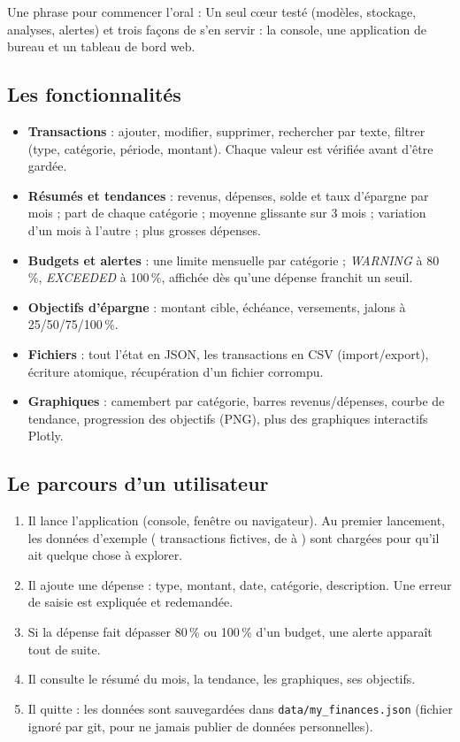 \documentclass[11pt,a4paper]{article}
\newcommand{\code}[1]{{\NoAutoSpacing\texttt{#1}}}
\begin{document}
\begin{alerte}
Une phrase pour commencer l'oral : \og Un seul cœur testé (modèles, stockage, analyses,
alertes) et trois façons de s'en servir : la console, une application de bureau et un
tableau de bord web. \fg
\end{alerte}

\subsection{Les fonctionnalités}
\begin{itemize}
  \item \textbf{Transactions} : ajouter, modifier, supprimer, rechercher par texte, filtrer
        (type, catégorie, période, montant). Chaque valeur est vérifiée avant d'être gardée.
  \item \textbf{Résumés et tendances} : revenus, dépenses, solde et taux d'épargne par mois ;
        part de chaque catégorie ; moyenne glissante sur 3 mois ; variation d'un mois à
        l'autre ; plus grosses dépenses.
  \item \textbf{Budgets et alertes} : une limite mensuelle par catégorie ; \emph{WARNING} à
        80\,\%, \emph{EXCEEDED} à 100\,\%, affichée dès qu'une dépense franchit un seuil.
  \item \textbf{Objectifs d'épargne} : montant cible, échéance, versements, jalons à
        25/50/75/100\,\%.
  \item \textbf{Fichiers} : tout l'état en JSON, les transactions en CSV (import/export),
        écriture atomique, récupération d'un fichier corrompu.
  \item \textbf{Graphiques} : camembert par catégorie, barres revenus/dépenses, courbe de
        tendance, progression des objectifs (PNG), plus des graphiques interactifs Plotly.
\end{itemize}

\subsection{Le parcours d'un utilisateur}
\begin{enumerate}
  \item Il lance l'application (console, fenêtre ou navigateur). Au premier lancement, les
        données d'exemple (\SampleCount{} transactions fictives, de \SampleFirstMonth{} à
        \SampleLastMonth) sont chargées pour qu'il ait quelque chose à explorer.
  \item Il ajoute une dépense : type, montant, date, catégorie, description. Une erreur de
        saisie est expliquée et redemandée.
  \item Si la dépense fait dépasser 80\,\% ou 100\,\% d'un budget, une alerte apparaît tout
        de suite.
  \item Il consulte le résumé du mois, la tendance, les graphiques, ses objectifs.
  \item Il quitte : les données sont sauvegardées dans \code{data/my\_finances.json}
        (fichier ignoré par git, pour ne jamais publier de données personnelles).
\end{enumerate}
\end{document}

